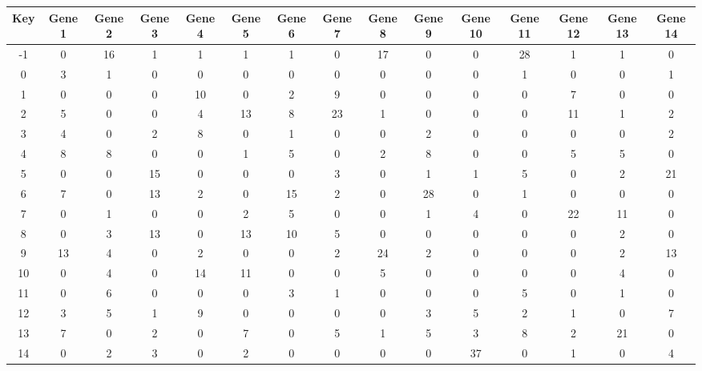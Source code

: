 \begin{tabular}{|c|c|c|c|c|c|c|c|c|c|c|c|c|c|c|}
\hline
Key & Gene 1 & Gene 2 & Gene 3 & Gene 4 & Gene 5 & Gene 6 & Gene 7 & Gene 8 & Gene 9 & Gene 10 & Gene 11 & Gene 12 & Gene 13 & Gene 14 \\
\hline
-1 & 0 & 16 & 1 & 1 & 1 & 1 & 0 & 17 & 0 & 0 & 28 & 1 & 1 & 0 \\
0 & 3 & 1 & 0 & 0 & 0 & 0 & 0 & 0 & 0 & 0 & 1 & 0 & 0 & 1 \\
1 & 0 & 0 & 0 & 10 & 0 & 2 & 9 & 0 & 0 & 0 & 0 & 7 & 0 & 0 \\
2 & 5 & 0 & 0 & 4 & 13 & 8 & 23 & 1 & 0 & 0 & 0 & 11 & 1 & 2 \\
3 & 4 & 0 & 2 & 8 & 0 & 1 & 0 & 0 & 2 & 0 & 0 & 0 & 0 & 2 \\
4 & 8 & 8 & 0 & 0 & 1 & 5 & 0 & 2 & 8 & 0 & 0 & 5 & 5 & 0 \\
5 & 0 & 0 & 15 & 0 & 0 & 0 & 3 & 0 & 1 & 1 & 5 & 0 & 2 & 21 \\
6 & 7 & 0 & 13 & 2 & 0 & 15 & 2 & 0 & 28 & 0 & 1 & 0 & 0 & 0 \\
7 & 0 & 1 & 0 & 0 & 2 & 5 & 0 & 0 & 1 & 4 & 0 & 22 & 11 & 0 \\
8 & 0 & 3 & 13 & 0 & 13 & 10 & 5 & 0 & 0 & 0 & 0 & 0 & 2 & 0 \\
9 & 13 & 4 & 0 & 2 & 0 & 0 & 2 & 24 & 2 & 0 & 0 & 0 & 2 & 13 \\
10 & 0 & 4 & 0 & 14 & 11 & 0 & 0 & 5 & 0 & 0 & 0 & 0 & 4 & 0 \\
11 & 0 & 6 & 0 & 0 & 0 & 3 & 1 & 0 & 0 & 0 & 5 & 0 & 1 & 0 \\
12 & 3 & 5 & 1 & 9 & 0 & 0 & 0 & 0 & 3 & 5 & 2 & 1 & 0 & 7 \\
13 & 7 & 0 & 2 & 0 & 7 & 0 & 5 & 1 & 5 & 3 & 8 & 2 & 21 & 0 \\
14 & 0 & 2 & 3 & 0 & 2 & 0 & 0 & 0 & 0 & 37 & 0 & 1 & 0 & 4 \\
\hline
\end{tabular}